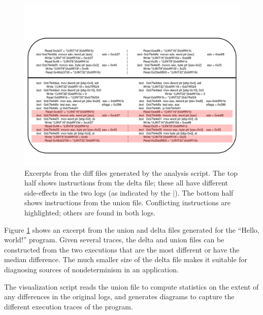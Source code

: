 \begin{figure}[h]
  \center
  \includegraphics[scale=0.7, trim=3cm 1.5cm 3cm 3cm]{log2.pdf}
  \caption[Excerpts from the side-by-side diff files generated by the analysis script]%
          {Excerpts from the diff files generated by the analysis script.
            The top half shows instructions from the delta file;
            these all have different side-effects in the two logs
            (as indicated by the $\vert$).
            The bottom half shows instructions from the union file.
            Conflicting instructions are highlighted; others are found in both logs.}
  \label{hw:logsys2}
\end{figure}

\noindent Figure \ref{hw:logsys2} shows an excerpt from the 
union and delta files generated for the ``Hello, world!''
program. Given several traces, the delta and union
files can be constructed from the two
executions that are the most different 
or have the median difference. The 
much smaller size of the delta file
makes it suitable for diagnosing
sources of nondeterminism
in an application. \newline

 \newline
The visualization script reads the union file to 
compute statistics on the extent of any differences in the
original logs, and generates diagrams to 
capture the different execution traces of the program.
 
